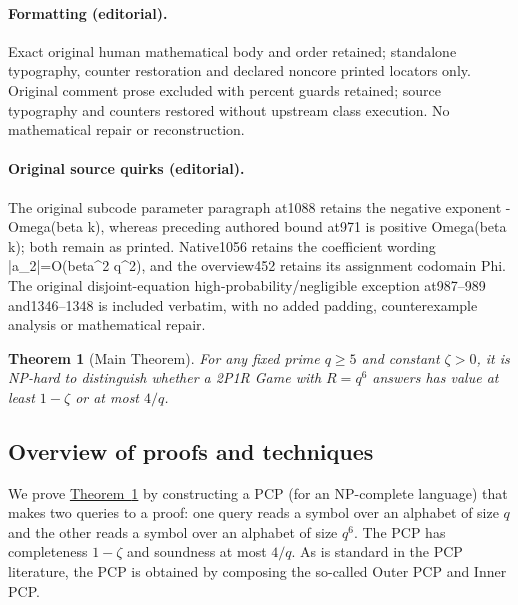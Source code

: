 \documentclass[10pt]{article}
\newtheorem{theorem}{Theorem}[section]
\theoremstyle{definition}
\numberwithin{equation}{section}
\newcommand{\expref}[2]{\texorpdfstring{\hyperref[#2]{#1~\ref{#2}}}{#1~\ref{#2}}}
\newcommand{\cclass}[1]{\textsf{#1}}
\begin{document}
\paragraph{Formatting (editorial).} Exact original human mathematical body and order retained; standalone typography, counter restoration and declared noncore printed locators only. Original comment prose excluded with percent guards retained; source typography and counters restored without upstream class execution. No mathematical repair or reconstruction.
\paragraph{Original source quirks (editorial).} The original subcode parameter paragraph at1088 retains the negative exponent -Omega(beta k), whereas preceding authored bound at971 is positive Omega(beta k); both remain as printed. Native1056 retains the coefficient wording |a\_2|=O(beta\textasciicircum{}2 q\textasciicircum{}2), and the overview452 retains its assignment codomain Phi. The original disjoint-equation high-probability/negligible exception at987–989 and1346–1348 is included verbatim, with no added padding, counterexample analysis or mathematical repair.
\endgroup
\clearpage
\setcounter{section}{1}\setcounter{theorem}{1}
\begin{theorem}[Main Theorem] \label{thm:main} For any fixed
prime $q \geq 5$ and constant $\zeta > 0$,
it is \cclass{NP}-hard to distinguish whether a 2P1R Game
with $R = q^6$ answers has value at least $1-\zeta$ or at most ${4}/{q}$.
\end{theorem}
\setcounter{subsection}{0}
\subsection{Overview of proofs and techniques}

We prove \expref{Theorem}{thm:main} by constructing a PCP (for an \cclass{NP}-complete language)
that makes two queries to a proof: one query reads a symbol over an alphabet of
size $q$ and the other reads a symbol
over an alphabet of size $q^6$. The PCP has completeness $1-\zeta$
and soundness at most ${4}/{q}$.
As is standard in the PCP literature, the PCP is obtained by composing the so-called
Outer PCP and Inner PCP.
\end{document}
